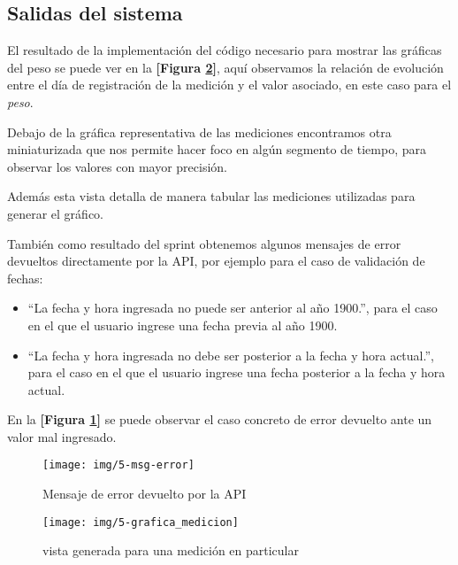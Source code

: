 \subsection{Salidas del sistema}

El resultado de la implementación del código necesario para mostrar las gráficas del peso se puede ver en la \textbf{[Figura \ref{5-grafica_medicion}]}, aquí observamos la relación de evolución entre el día de registración de la medición y el valor asociado, en este caso para el \textit{peso}.

Debajo de la gráfica representativa de las mediciones encontramos otra miniaturizada que nos permite hacer foco en algún segmento de tiempo, para observar los valores con mayor precisión.

Además esta vista detalla de manera tabular las mediciones utilizadas para generar el gráfico.

También como resultado del sprint obtenemos algunos mensajes de error devueltos directamente por la API, por ejemplo para el caso de validación de fechas:

\begin{itemize}
	\item ``La fecha y hora ingresada no puede ser anterior al año 1900.'', para el caso en el que el usuario ingrese una fecha previa al año 1900.
	\item ``La fecha y hora ingresada no debe ser posterior a la fecha y hora actual.'', para el caso en el que el usuario ingrese una fecha posterior a la fecha y hora actual.
\end{itemize}

En la \textbf{[Figura \ref{5-msg-error}]} se puede observar el caso concreto de error devuelto ante un valor mal ingresado.


\begin{figure}[h!]
	\centering
	\texttt{[image: img/5-msg-error]}
	\caption{Mensaje de error devuelto por la API}
	\label{5-msg-error}
\end{figure}


\begin{figure}[h!]
	\centering
	\texttt{[image: img/5-grafica\_medicion]}
	\caption{vista generada para una medición en particular}
	\label{5-grafica_medicion}
\end{figure}


\clearpage








